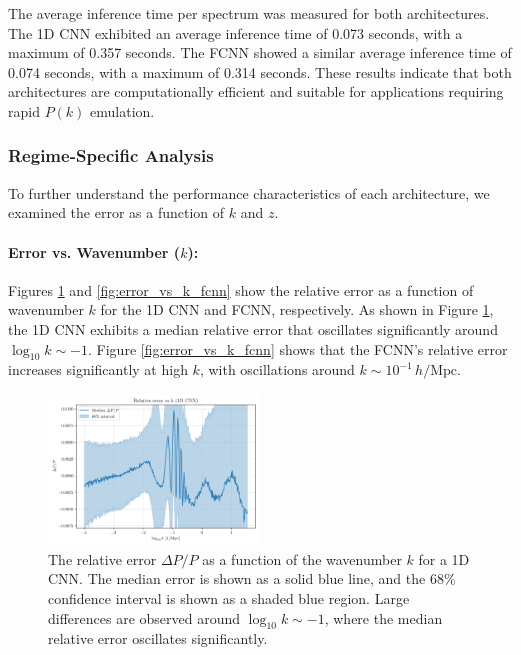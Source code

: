 \documentclass[twocolumn]{aastex631}
\begin{document}
The average inference time per spectrum was measured for both architectures. The 1D CNN exhibited an average inference time of 0.073 seconds, with a maximum of 0.357 seconds. The FCNN showed a similar average inference time of 0.074 seconds, with a maximum of 0.314 seconds. These results indicate that both architectures are computationally efficient and suitable for applications requiring rapid $P(k)$ emulation.

\subsubsection{Regime-Specific Analysis}

To further understand the performance characteristics of each architecture, we examined the error as a function of $k$ and $z$.

\paragraph{Error vs. Wavenumber ($k$):}

Figures \ref{fig:error_vs_k_cnn1d} and \ref{fig:error_vs_k_fcnn} show the relative error as a function of wavenumber $k$ for the 1D CNN and FCNN, respectively. As shown in Figure \ref{fig:error_vs_k_cnn1d}, the 1D CNN exhibits a median relative error that oscillates significantly around $\log_{10} k \sim -1$. Figure \ref{fig:error_vs_k_fcnn} shows that the FCNN's relative error increases significantly at high $k$, with oscillations around $k \sim 10^{-1} \, h/\mathrm{Mpc}$.

\begin{figure}[h]
    \centering
    \includegraphics[width=0.5\textwidth]{plots/error_vs_k_cnn1d_3_1745408317.png}
    \caption{\label{fig:error_vs_k_cnn1d}The relative error $\Delta P/P$ as a function of the wavenumber $k$ for a 1D CNN. The median error is shown as a solid blue line, and the 68\% confidence interval is shown as a shaded blue region. Large differences are observed around $\log_{10} k \sim -1$, where the median relative error oscillates significantly.}
\end{figure}
\end{document}
